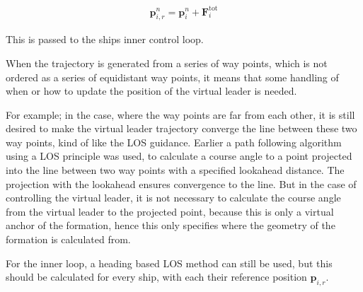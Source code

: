 \begin{align}
	\mathbf{p}_{i,r}^n = \mathbf{p}_i^n + \mathbf{F}_i ^\text{tot}
\end{align}

This is passed to the ships inner control loop.


When the trajectory is generated from a series of way points, which is
not ordered as a series of equidistant way points, it means that some
handling of when or how to update the position of the virtual leader
is needed.

For example; in the case, where the way points are far from each
other, it is still desired to make the virtual leader trajectory
converge the line between these two way points, kind of like the
\ac{LOS} guidance. Earlier a path following algorithm using a \ac{LOS}
principle was used, to calculate a course angle to a point projected
into the line between two way points with a specified lookahead
distance. The projection with the lookahead ensures convergence to the
line. But in the case of controlling the virtual leader, it is not
necessary to calculate the course angle from the virtual leader to the
projected point, because this is only a virtual anchor of the
formation, hence this only specifies where the geometry of the
formation is calculated from. 

For the inner loop, a heading based \ac{LOS} method can still be used,
but this should be calculated for every ship, with each their
reference position $\mathbf{p}_{i,r}$.



